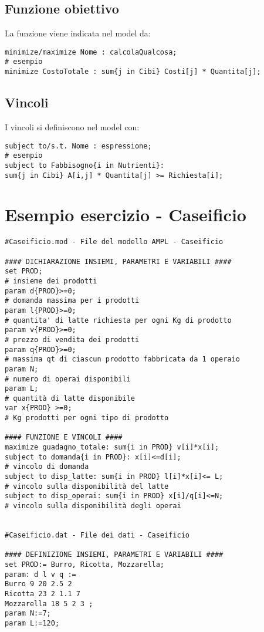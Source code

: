 \subsection{Funzione obiettivo}

La funzione viene indicata nel model da:
\begin{verbatim}
minimize/maximize Nome : calcolaQualcosa;
# esempio
minimize CostoTotale : sum{j in Cibi} Costi[j] * Quantita[j];
\end{verbatim}


\subsection{Vincoli}
I vincoli si definiscono nel model con:
\begin{verbatim}
subject to/s.t. Nome : espressione;
# esempio
subject to Fabbisogno{i in Nutrienti}:
sum{j in Cibi} A[i,j] * Quantita[j] >= Richiesta[i];
\end{verbatim}

\section{Esempio esercizio - Caseificio}
\begin{framed}
\begin{verbatim}
#Caseificio.mod - File del modello AMPL - Caseificio

#### DICHIARAZIONE INSIEMI, PARAMETRI E VARIABILI ####
set PROD;
# insieme dei prodotti
param d{PROD}>=0;
# domanda massima per i prodotti
param l{PROD}>=0;
# quantita' di latte richiesta per ogni Kg di prodotto
param v{PROD}>=0;
# prezzo di vendita dei prodotti
param q{PROD}>=0;
# massima qt di ciascun prodotto fabbricata da 1 operaio
param N;
# numero di operai disponibili
param L;
# quantità di latte disponibile
var x{PROD} >=0;
# Kg prodotti per ogni tipo di prodotto

#### FUNZIONE E VINCOLI ####
maximize guadagno_totale: sum{i in PROD} v[i]*x[i];
subject to domanda{i in PROD}: x[i]<=d[i];
# vincolo di domanda
subject to disp_latte: sum{i in PROD} l[i]*x[i]<= L;
# vincolo sulla disponibilità del latte
subject to disp_operai: sum{i in PROD} x[i]/q[i]<=N;
# vincolo sulla disponibilità degli operai


#Caseificio.dat - File dei dati - Caseificio

#### DEFINIZIONE INSIEMI, PARAMETRI E VARIABILI ####
set PROD:= Burro, Ricotta, Mozzarella;
param: d l v q :=
Burro 9 20 2.5 2
Ricotta 23 2 1.1 7
Mozzarella 18 5 2 3 ;
param N:=7;
param L:=120;
\end{verbatim}
\end{framed}




